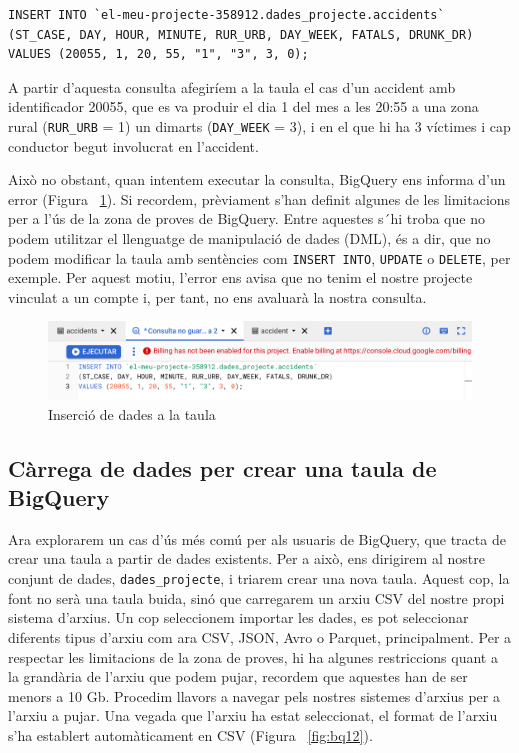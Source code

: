 \documentclass[12pt,longbibliography]{article}
\theoremstyle{definition}
\theoremstyle{remark}
\begin{document}
\begin{verbatim}
INSERT INTO `el-meu-projecte-358912.dades_projecte.accidents` 
(ST_CASE, DAY, HOUR, MINUTE, RUR_URB, DAY_WEEK, FATALS, DRUNK_DR)
VALUES (20055, 1, 20, 55, "1", "3", 3, 0);
\end{verbatim}

A partir d'aquesta consulta afegiríem a la taula el cas d'un accident amb identificador 20055, que es va produir el dia 1 del mes a les 20:55 a una zona rural (\verb|RUR_URB| = 1) un dimarts (\verb|DAY_WEEK| = 3), i en el que hi ha 3 víctimes i cap conductor begut involucrat en l'accident.

Això no obstant, quan intentem executar la consulta, BigQuery ens informa d'un error (Figura ~\ref{fig:bq11}). Si recordem, prèviament s'han definit algunes de les limitacions per a l'ús de la zona de proves de BigQuery. Entre aquestes s´hi troba que no podem utilitzar el llenguatge de manipulació de dades (DML), és a dir, que no podem modificar la taula amb sentències com \verb|INSERT INTO|, \verb|UPDATE| o \verb|DELETE|, per exemple. Per aquest motiu, l'error ens avisa que no tenim el nostre projecte vinculat a un compte i, per tant, no ens avaluarà la nostra consulta.


\begin{figure}[h!]
\begin{center}
\includegraphics[width=12cm]{bq11}
\end{center}
\caption{Inserció de dades a la taula}
\label{fig:bq11}
\end{figure}


\newpage

\subsection{Càrrega de dades per crear una taula de BigQuery}

Ara explorarem un cas d'ús més comú per als usuaris de BigQuery, que tracta de crear una taula a partir de dades existents. Per a això, ens dirigirem al nostre conjunt de dades, \verb|dades_projecte|, i triarem crear una nova taula. Aquest cop, la font no serà una taula buida, sinó que carregarem un arxiu CSV del nostre propi sistema d'arxius. Un cop seleccionem importar les dades, es pot seleccionar diferents tipus d'arxiu com ara CSV, JSON, Avro o Parquet, principalment. Per a respectar les limitacions de la zona de proves, hi ha algunes restriccions quant a la grandària de l'arxiu que podem pujar, recordem que aquestes han de ser menors a 10 Gb. Procedim llavors a navegar pels nostres sistemes d'arxius per a l'arxiu a pujar. Una vegada que l'arxiu ha estat seleccionat, el format de l'arxiu s'ha establert automàticament en CSV (Figura ~\ref{fig:bq12}). 
\end{document}
